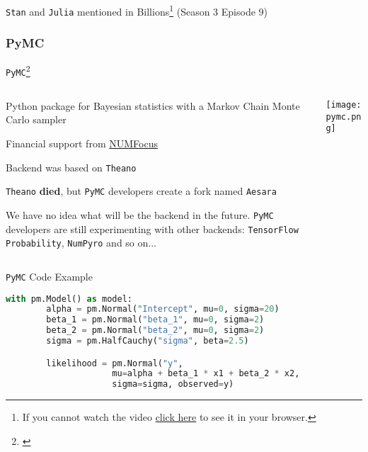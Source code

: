 \begin{frame}{\texttt{Stan} and \texttt{Julia} mentioned in Billions\footnote{
			If you cannot watch the video \href{https://github.com/storopoli/Bayesian-Statistics/blob/main/images/stan_billions_subtitled.mp4?raw=true}{click here}
			to see it in your browser.} (Season 3 Episode 9)}
	\centering
\end{frame}

\subsubsection{PyMC}
\begin{frame}{\texttt{PyMC}\footnote{\textcite{pymc3}}}
	\begin{columns}
		\begin{column}{0.8\textwidth}
			\begin{vfilleditems}
				\small
				\item Python package for Bayesian statistics
				with a Markov Chain Monte Carlo sampler
				\item Financial support from \href{https://numfocus.org/}{NUMFocus}
				\item Backend was based on \texttt{Theano}
				\item \texttt{Theano} \textbf{died}, but \texttt{PyMC} developers create a fork
				named \texttt{Aesara}
				\item We have no idea what will be the backend in
				the future.
				\texttt{PyMC} developers are still experimenting with other
				backends: \texttt{TensorFlow Probability}, \texttt{NumPyro}
				and so on...
			\end{vfilleditems}
		\end{column}
		\begin{column}{0.2\textwidth}
			\centering
			\texttt{[image: pymc.png]}
		\end{column}
	\end{columns}
\end{frame}

\begin{frame}[fragile]{\texttt{PyMC} Code Example}
	\begin{lstlisting}[basicstyle=\small, language=Python]
    with pm.Model() as model:
        alpha = pm.Normal("Intercept", mu=0, sigma=20)
        beta_1 = pm.Normal("beta_1", mu=0, sigma=2)
        beta_2 = pm.Normal("beta_2", mu=0, sigma=2)
        sigma = pm.HalfCauchy("sigma", beta=2.5)

        likelihood = pm.Normal("y",
                     mu=alpha + beta_1 * x1 + beta_2 * x2,
                     sigma=sigma, observed=y)
\end{lstlisting}
\end{frame}

